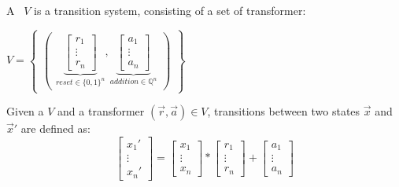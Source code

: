 \documentclass[%
10pt,
dvipsnames,
]{beamer}
\begin{document}
\begin{frame}[t]
	\frametitle{\qvasr}
	\begin{definition}
			A \qvasr\ $V$ is a transition system, consisting of a set of transformer: \\
			\begin{center}
			 $ V = 
			\begin{Bmatrix}
				\begin{pmatrix}
					\underbrace{
					\begin{bmatrix}
						r_1 \\
						\vdots \\
						r_n
					\end{bmatrix}}_{reset \in \{0,1\}^n},
					\underbrace{
					\begin{bmatrix}
						a_1 \\
						\vdots \\
						a_n
					\end{bmatrix}}_{addition \in \mathbb{Q}^n}
				\end{pmatrix}
			\end{Bmatrix}
		$
		\end{center}
	\end{definition}
	\begin{definition}
	Given a \qvasr $V$ and a transformer $(\vec{r}, \vec{a}) \in V$, transitions between two states $\vec{x}$ and $\vec{x}'$ are defined as: \\
	\begin{equation*}
			\begin{bmatrix}
				x_1' \\
				\vdots \\
				x_n'
			\end{bmatrix}
		=
			\begin{bmatrix}
				x_1 \\
				\vdots \\
				x_n
			\end{bmatrix}
		*
			\begin{bmatrix}
			r_1 \\
			\vdots \\
			r_n
			\end{bmatrix}
		+
			\begin{bmatrix}
			a_1 \\
			\vdots \\
			a_n
		\end{bmatrix}		
	\end{equation*}
	\end{definition}
\end{frame}
\end{document}
